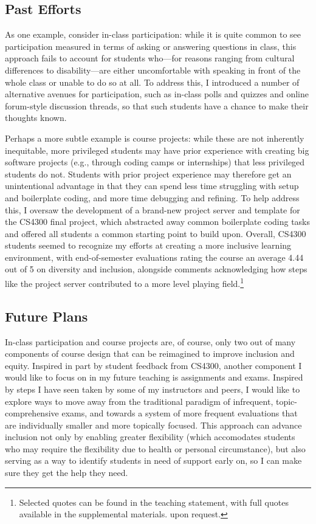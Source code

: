 \documentclass[12pt,letterpaper]{article}
\begin{document}
\subsection{Past Efforts}
As one example, consider in-class participation: while it is quite common to see participation measured in terms of asking or answering questions in class, this approach fails to account for students who---for reasons ranging from cultural differences to disability---are either uncomfortable with speaking in front of the whole class or unable to do so at all.
To address this, I introduced a number of alternative avenues for participation, such as in-class polls and quizzes and online forum-style discussion threads, so that such students have a chance to make their thoughts known.

Perhaps a more subtle example is course projects: while these are not inherently inequitable, more privileged students may have prior experience with creating big software projects (e.g., through coding camps or internships) that less privileged students do not.
Students with prior project experience may therefore get an unintentional advantage in that they can spend less time struggling with setup and boilerplate coding, and more time debugging and refining.
To help address this, I oversaw the development of a brand-new project server and template for the CS4300 final project, which abstracted away common boilerplate coding tasks and offered all students a common starting point to build upon.
Overall, CS4300 students seemed to recognize my efforts at creating a more inclusive learning environment, with end-of-semester evaluations rating the course an average 4.44 out of 5 on diversity and inclusion, alongside comments acknowledging how steps like the project server contributed to a more level playing field.\footnote{%
Selected quotes can be found in the teaching statement, with full quotes available
\ifsupplementals
in the supplemental materials.
\else
upon request.
\fi
}

\subsection{Future Plans}
In-class participation and course projects are, of course, only two out of many components of course design that can be reimagined to improve inclusion and equity.
Inspired in part by student feedback from CS4300, another component I would like to focus on in my future teaching is assignments and exams.
Inspired by steps I have seen taken by some of my instructors and peers, I would like to explore ways to move away from the traditional paradigm of infrequent, topic-comprehensive exams, and towards a system of more frequent evaluations that are individually smaller and more topically focused.
This approach can advance inclusion not only by enabling greater flexibility (which accomodates students who may require the flexibility due to health or personal circumstance), but also serving as a way to identify students in need of support early on, so I can make sure they get the help they need.
\end{document}

